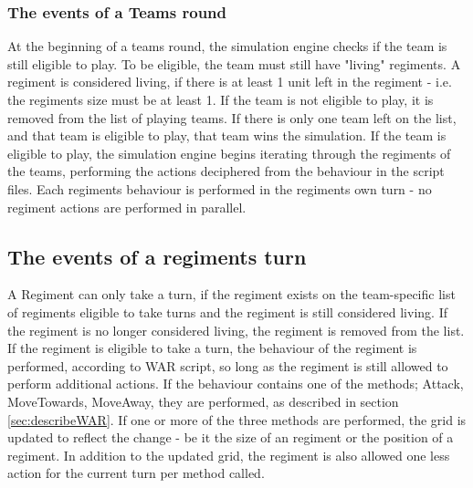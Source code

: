 		\subsubsection{The events of a Teams round}
		At the beginning of a teams round, the simulation engine checks if the team is still eligible to play. To be eligible, the team must still have "living" regiments. A regiment is considered living, if there is at least 1 unit left in the regiment - i.e. the regiments size must be at least 1. If the team is not eligible to play, it is removed from the list of playing teams. If there is only one team left on the list, and that team is eligible to play, that team wins the simulation. If the team is eligible to play, the simulation engine begins iterating through the regiments of the teams, performing the actions deciphered from the behaviour in the script files. Each regiments behaviour is performed in the regiments own turn - no regiment actions are performed in parallel.
		\subsection{The events of a regiments turn}
		A Regiment can only take a turn, if the regiment exists on the team-specific list of regiments eligible to take turns and the regiment is still considered living. If the regiment is no longer considered living, the regiment is removed from the list. If the regiment is eligible to take a turn, the behaviour of the regiment is performed, according to WAR script, so long as the regiment is still allowed to perform additional actions. If the behaviour contains one of the methods; Attack, MoveTowards, MoveAway, they are performed, as described in section \ref{sec:describeWAR}. If one or more of the three methods are performed, the grid is updated to reflect the change - be it the size of an regiment or the position of a regiment. In addition to the updated grid, the regiment is also allowed one less action for the current turn per method called.